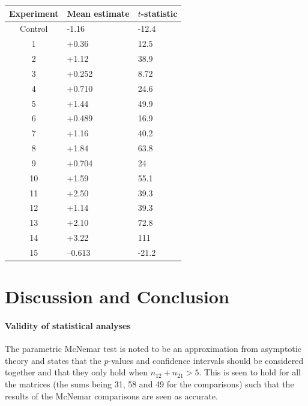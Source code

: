 \documentclass[11pt,fleqn]{article}
\begin{document}
\begin{table}[H]
	\centering
	\begin{tabular}{c|ll}
		Experiment & Mean estimate & $ t $-statistic \\\hline 
		Control           & -1.16    & -12.4           \\
\hline 
		1                 & +0.36     & 12.5            \\
		2                 & +1.12     & 38.9            \\
		3                 & +0.252    & 8.72            \\
		4                 & +0.710    & 24.6            \\
		5                 & +1.44     & 49.9            \\
		6                 & +0.489    & 16.9            \\
		7                 & +1.16     & 40.2            \\
		8                 & +1.84     & 63.8            \\
		9                 & +0.704    & 24              \\
		10                & +1.59     & 55.1            \\
		11                & +2.50     & 39.3            \\
		12                & +1.14     & 39.3            \\
		13                & +2.10     & 72.8            \\
		14                & +3.22     & 111             \\
		15                & --0.613   & -21.2          
	\end{tabular}
\end{table}

\section{Discussion and Conclusion}
\paragraph{Validity of statistical analyses} The parametric McNemar test is noted to be an approximation from asymptotic theory and \cite{Tue} states that the \(p\)-values and confidence intervals should be considered together and that they only hold when \(n_{12}+n_{21}> 5\). This is seen to hold for all the matrices (the sums being 31, 58 and 49 for the comparisons) such that the results of the McNemar comparisons are seen as accurate.
\end{document}
